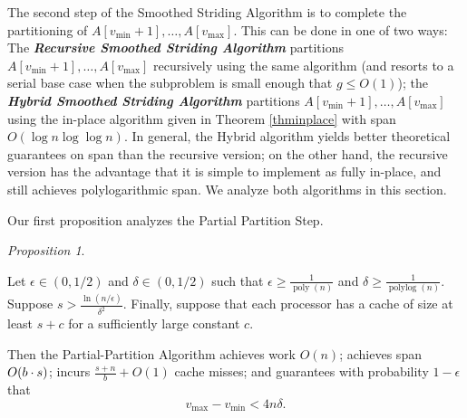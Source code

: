 \documentclass[sigplan, 10pt, nonacm]{acmart}
\DeclarePairedDelimiter{\paren}{(}{)}
\newcommand{\poly}{\operatorname{poly}}
\newcommand{\polylog}{\operatorname{polylog}}
\newcommand{\defn}[1]{{\textit{\textbf{\boldmath #1}}}}
\renewcommand{\paragraph}[1]{\vspace{0.09in}\noindent{\bf \boldmath #1.}}
\theoremstyle{remark}
\newtheorem{proposition}[thm]{Proposition}
\theoremstyle{remark}
\begin{document}
The second step of the Smoothed Striding Algorithm is to complete the
partitioning of $A[v_{\text{min}} + 1], \ldots, A[v_{\text{max}}]$. This can be done
in one of two ways: The \defn{Recursive Smoothed Striding Algorithm}
partitions $A[v_{\text{min}} + 1], \ldots, A[v_{\text{max}}]$ recursively using the
same algorithm (and resorts to a serial base case when the subproblem
is small enough that $g \le O(1)$); the \defn{Hybrid Smoothed Striding
  Algorithm} partitions $A[v_{\text{min}} + 1], \ldots, A[v_{\text{max}}]$ using the
in-place algorithm given in Theorem \ref{thminplace} with span $O(\log
n \log \log n)$. In general, the Hybrid algorithm yields better
theoretical guarantees on span than the recursive version; on the
other hand, the recursive version has the advantage that it is
simple to implement as fully in-place, and still achieves
polylogarithmic span. We analyze both algorithms in this section.



\paragraph{Algorithm Analysis} Our first proposition analyzes the Partial Partition Step.
\begin{proposition}
  \label{prop:generalResult}
  
  Let $\epsilon \in (0, 1/2)$ and $\delta \in (0, 1/2)$ such that
  $\epsilon \ge \frac{1}{\poly(n)}$ and $\delta \ge
  \frac{1}{\polylog(n)}$. Suppose $s > \frac{\ln
    (n/\epsilon)}{\delta^2}$. Finally, suppose that each processor has
  a cache of size at least $s + c$ for a sufficiently large constant
  $c$.

  Then the Partial-Partition Algorithm achieves work $O(n)$; achieves
  span $O\paren*{b \cdot s}$; incurs $\frac{s+n}{b} + O(1)$ cache
  misses; and guarantees with probability $1 - \epsilon$ that
  $$v_{\text{max}}-v_{\text{min}} < 4 n \delta.$$
\end{proposition}
\end{document}
